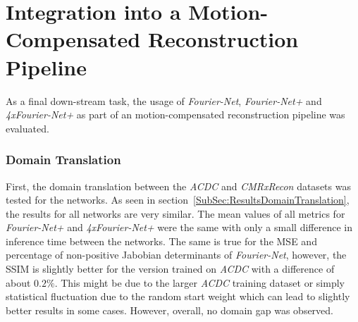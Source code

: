 \section{Integration into a Motion-Compensated Reconstruction Pipeline} \label{Sec:DiscussionIntegrationMotion-CompensatedReconstructionPipeline}
As a final down-stream task, the usage of \emph{Fourier-Net}, \emph{Fourier-Net+} and \emph{4xFourier-Net+} as part of an motion-compensated reconstruction pipeline was evaluated.

\subsubsection{Domain Translation} \label{SubSec:DiscussionDomainTranslation}
First, the domain translation between the \emph{ACDC} and \emph{CMRxRecon} datasets was tested for the networks. As seen in section~\ref{SubSec:ResultsDomainTranslation}, the results for all networks are very similar. The mean values of all metrics for \emph{Fourier-Net+} and \emph{4xFourier-Net+} were the same with only a small difference in inference time between the networks. The same is true for the MSE and percentage of non-positive Jabobian determinants of \emph{Fourier-Net}, however, the SSIM is slightly better for the version trained on \emph{ACDC} with a difference of about $0.2 \%$. This might be due to the larger \emph{ACDC} training dataset or simply statistical fluctuation due to the random start weight which can lead to slightly better results in some cases. However, overall, no domain gap was observed.


